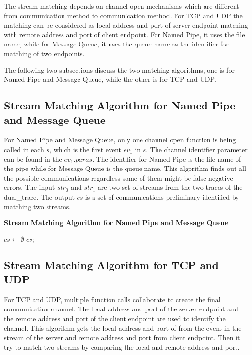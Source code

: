 The stream matching depends on channel open mechanisms which are different from communication method to communication method. For TCP and UDP the matching can be considered as local address and port of server endpoint matching with remote address and port of client endpoint. For Named Pipe, it uses the file name, while for Message Queue, it uses the queue name as the identifier for matching of two endpoints. 

The following two subsections discuss the two matching algorithms, one is for Named Pipe and Message Queue, while the other is for TCP and UDP.

\subsection{Stream Matching Algorithm for Named Pipe and Message Queue}
For Named Pipe and Message Queue, only one channel open function is being called in each $s$, which is the first event $ev_1$ in $s$. The channel identifier parameter can be found in the $ev_1.paras$. The identifier for Named Pipe is the file name of the pipe while for Message Queue is the queue name. This algorithm finds out all the possible communications regardless some of them might be false negative errors. The input $str_0$ and $str_1$ are two set of streams from the two traces of the dual\_trace. The output $cs$ is a set of communications preliminary identified by matching two streams.

\begin{algorithm}[H]
\DontPrintSemicolon
\caption{{\bf Stream Matching Algorithm for Named Pipe and Message Queue} \label{matchAlg1}}
$cs \leftarrow \emptyset$\; 
\KwRet $cs$;\;
\end{algorithm} 

\subsection{Stream Matching Algorithm for TCP and UDP}
For TCP and UDP, multiple function calls collaborate to create the final communication channel. The local address and port of the server endpoint and the remote address and port of the client endpoint are used to identify the channel. This algorithm gets the local address and port of from the event in the stream of the server and remote address and port from client endpoint. Then it try to match two streams by comparing the local and remote address and port. 

